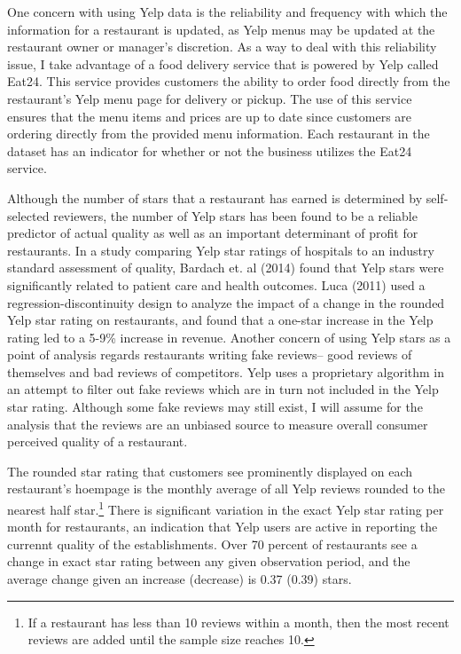 \documentclass[11pt]{article}
\begin{document}
One concern with using Yelp data is the reliability and frequency with which the information for a restaurant is updated, as Yelp menus may be updated at the restaurant owner or manager's discretion. As a way to deal with this reliability issue, I take advantage of a food delivery service that is powered by Yelp called Eat24. This service provides customers the ability to order food directly from the restaurant's Yelp menu page for delivery or pickup. The use of this service ensures that the menu items and prices are up to date since customers are ordering directly from the provided menu information. Each restaurant in the dataset has an indicator for whether or not the business utilizes the Eat24 service. 

Although the number of stars that a restaurant has earned is determined by self-selected reviewers, the number of Yelp stars has been found to be a reliable predictor of actual quality as well as an important determinant of profit for restaurants. In a study comparing Yelp star ratings of hospitals to an industry standard assessment of quality, Bardach et. al (2014) found that Yelp stars were significantly related to patient care and health outcomes. Luca (2011) used a regression-discontinuity design to analyze the impact of a change in the  rounded Yelp star rating on restaurants, and found that a one-star increase in the Yelp rating led to a 5-9\% increase in revenue. Another concern of using Yelp stars as a point of analysis regards restaurants writing fake reviews-- good reviews of themselves and bad reviews of competitors. Yelp uses a proprietary algorithm in an attempt to filter out fake reviews which are in turn not included in the Yelp star rating. Although some fake reviews may still exist, I will assume for the analysis that the reviews are an unbiased source to measure overall consumer perceived quality of a restaurant. 

The rounded star rating that customers see prominently displayed on each restaurant's hoempage is the monthly average of all Yelp reviews rounded to the nearest half star.\footnote{If a restaurant has less than 10 reviews within a month, then the most recent reviews are added until the sample size reaches 10.} There is significant variation in the exact Yelp star rating per month for restaurants, an indication that Yelp users are active in reporting the currennt quality of the establishments. Over 70 percent of restaurants see a change in exact star rating between any given observation period, and the average change given an increase (decrease) is 0.37 (0.39) stars.
\end{document}
